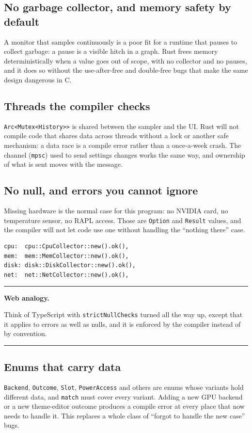 \documentclass[11pt,a4paper]{article}
\newcommand{\code}[1]{\texttt{#1}}
\newcommand{\file}[1]{\texttt{#1}}
\newenvironment{callout}[1]{%
  \par\medskip\noindent\hrule\vspace{0.4em}\noindent\small\textbf{#1.}\ \ignorespaces
}{%
  \par\vspace{0.3em}\noindent\hrule\medskip
}
\begin{document}
\subsection{No garbage collector, and memory safety by default}
A monitor that samples continuously is a poor fit for a runtime that pauses to collect
garbage: a pause is a visible hitch in a graph. Rust frees memory deterministically when a
value goes out of scope, with no collector and no pauses, and it does so without the
use-after-free and double-free bugs that make the same design dangerous in C.

\subsection{Threads the compiler checks}
\code{Arc<Mutex<History>>} is shared between the sampler and the UI. Rust will not compile
code that shares data across threads without a lock or another safe mechanism: a data race is
a compile error rather than a once-a-week crash. The channel (\code{mpsc}) used to send
settings changes works the same way, and ownership of what is sent moves with the message.

\subsection{No null, and errors you cannot ignore}
Missing hardware is the normal case for this program: no NVIDIA card, no temperature sensor,
no RAPL access. Those are \code{Option} and \code{Result} values, and the compiler will not
let code use one without handling the ``nothing there'' case.

\begin{lstlisting}[caption={\file{sampler/mod.rs}: a collector that failed to start is just \code{None}.}]
cpu:  cpu::CpuCollector::new().ok(),
mem:  mem::MemCollector::new().ok(),
disk: disk::DiskCollector::new().ok(),
net:  net::NetCollector::new().ok(),
\end{lstlisting}

\begin{callout}{Web analogy}
Think of TypeScript with \code{strictNullChecks} turned all the way up, except that it applies
to errors as well as nulls, and it is enforced by the compiler instead of by convention.
\end{callout}

\subsection{Enums that carry data}
\code{Backend}, \code{Outcome}, \code{Slot}, \code{PowerAccess} and others are enums whose
variants hold different data, and \code{match} must cover every variant. Adding a new GPU
backend or a new theme-editor outcome produces a compile error at every place that now needs
to handle it. This replaces a whole class of ``forgot to handle the new case'' bugs.
\end{document}
